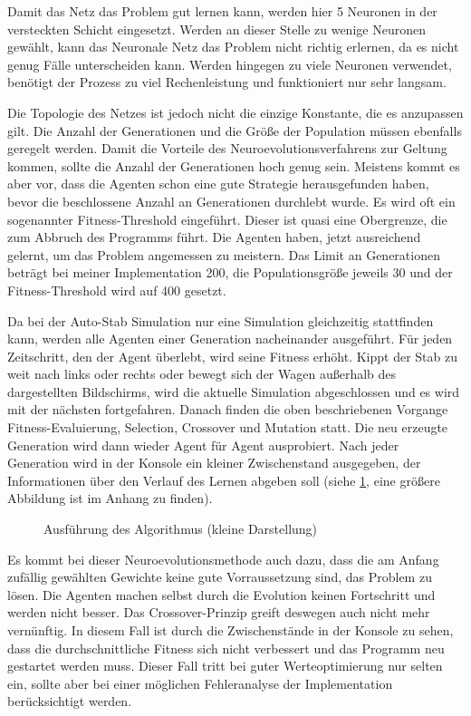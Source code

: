 \documentclass[parskip=half,titlepage]{scrartcl}
\begin{document}
Damit das Netz das Problem gut lernen kann, werden hier 5 Neuronen in der versteckten Schicht eingesetzt. Werden an dieser Stelle zu wenige Neuronen gewählt, kann das Neuronale Netz das Problem nicht richtig erlernen, da es nicht genug Fälle unterscheiden kann. Werden hingegen zu viele Neuronen verwendet, benötigt der Prozess zu viel Rechenleistung und funktioniert nur sehr langsam. 

Die Topologie des Netzes ist jedoch nicht die einzige Konstante, die es anzupassen gilt. Die Anzahl der Generationen und die Größe der Population müssen ebenfalls geregelt werden. Damit die Vorteile des Neuroevolutionsverfahrens zur Geltung kommen, sollte die Anzahl der Generationen hoch genug sein. Meistens kommt es aber vor, dass die Agenten schon eine gute Strategie herausgefunden haben, bevor die beschlossene Anzahl an Generationen durchlebt wurde. Es wird oft ein sogenannter Fitness-Threshold eingeführt. Dieser ist quasi eine Obergrenze, die zum Abbruch des Programms führt. Die Agenten haben, jetzt ausreichend gelernt, um das Problem angemessen zu meistern. Das Limit an Generationen beträgt bei meiner Implementation 200, die Populationsgröße jeweils 30 und der Fitness-Threshold wird auf 400 gesetzt.

Da bei der Auto-Stab Simulation nur eine Simulation gleichzeitig stattfinden kann, werden alle Agenten einer Generation nacheinander ausgeführt. Für jeden Zeitschritt, den der Agent überlebt, wird seine Fitness erhöht. Kippt der Stab zu weit nach links oder rechts oder bewegt sich der Wagen außerhalb des dargestellten Bildschirms, wird die aktuelle Simulation abgeschlossen und es wird mit der nächsten fortgefahren. Danach finden die oben beschriebenen Vorgange Fitness-Evaluierung, Selection, Crossover und Mutation statt. Die neu erzeugte Generation wird dann wieder Agent für Agent ausprobiert. Nach jeder Generation wird in der Konsole ein kleiner Zwischenstand ausgegeben, der Informationen über den Verlauf des Lernen abgeben soll (siehe \cref{fig:main}, eine größere Abbildung ist im Anhang zu finden). 

\begin{figure}[h]
 
 \caption{Ausführung des Algorithmus (kleine Darstellung)}
 \label{fig:main}
\end{figure}

Es kommt bei dieser Neuroevolutionsmethode auch dazu, dass die am Anfang zufällig gewählten Gewichte   keine gute Vorraussetzung sind, das Problem zu lösen. Die Agenten machen selbst durch die Evolution keinen Fortschritt und werden nicht besser. Das Crossover-Prinzip greift deswegen auch nicht mehr vernünftig. In diesem Fall ist durch die Zwischenstände in der Konsole zu sehen, dass die durchschnittliche Fitness sich nicht verbessert und das Programm neu gestartet werden muss. Dieser Fall tritt bei guter Werteoptimierung nur selten ein, sollte aber bei einer möglichen Fehleranalyse der Implementation berücksichtigt werden.
\end{document}
